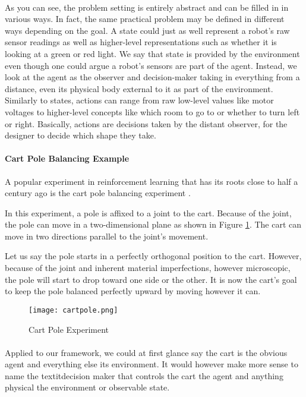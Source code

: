 \paragraph{}
As you can see, the problem setting is entirely abstract
and can be filled in in various ways.
In fact, the same practical problem may be defined in different ways
depending on the goal.
A state could just as well represent a robot's raw sensor readings
as well as higher-level representations
such as whether it is looking at a green or red light.
We say that state is provided by the environment
even though one could argue a robot's sensors
are part of the agent.
Instead, we look at the agent as the observer and decision-maker
taking in everything from a distance,
even its physical body external to it
as part of the environment.
Similarly to states,
actions can range from raw low-level values
like motor voltages
to higher-level concepts like which room to go to
or whether to turn left or right.
Basically, actions are decisions taken by the distant observer,
for the designer to decide which shape they take.

\paragraph{Cart Pole Balancing Example}
A popular experiment in reinforcement learning
that has its roots close to half a century ago
is the cart pole balancing experiment
\parencite{Michie1968}.

In this experiment,
a pole is affixed to a joint to the cart.
Because of the joint,
the pole can move in a two-dimensional plane
as shown in Figure \ref{fig:cartpole}.
The cart can move in two directions
parallel to the joint's movement.

Let us say the pole starts in a perfectly orthogonal
position to the cart.
However, because of the joint and
inherent material imperfections, however microscopic,
the pole will start to drop toward one side or the other.
It is now the cart's goal
to keep the pole balanced perfectly upward
by moving however it can.

\begin{figure}[ht]
  \centering
  \texttt{[image: cartpole.png]}
  \caption{Cart Pole Experiment
  }
  \label{fig:cartpole}
\end{figure}

\paragraph{}
Applied to our framework,
we could at first glance say the cart is the obvious agent
and everything else its environment.
It would however make more sense
to name the textit{decision maker} that controls the cart the agent
and anything physical the environment or observable state.

